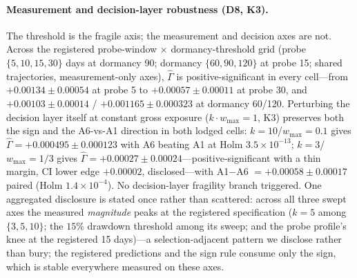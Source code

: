 \documentclass{article}
\begin{document}
\paragraph{Measurement and decision-layer robustness (D8, K3).} The
threshold is the fragile axis; the measurement and decision axes are
not. Across the registered probe-window $\times$ dormancy-threshold
grid (probe $\{5, 10, 15, 30\}$ days at dormancy 90; dormancy
$\{60, 90, 120\}$ at probe 15; shared trajectories, measurement-only
axes), $\hat\Gamma$ is positive-significant in every cell---from
$+0.00134 \pm 0.00054$ at probe 5 to $+0.00057 \pm 0.00011$ at probe
30, and $+0.00103 \pm 0.00014$ / $+0.001165 \pm 0.000323$ at dormancy
60/120. Perturbing the decision layer itself at constant gross
exposure ($k \cdot w_{\max} = 1$, K3) preserves both the sign and
the A6-vs-A1 direction in both lodged cells: $k{=}10$/$w_{\max}{=}0.1$
gives $\hat\Gamma = +0.000495 \pm 0.000123$ with A6 beating A1 at Holm
$3.5\times10^{-13}$; $k{=}3$/$w_{\max}{=}1/3$ gives
$\hat\Gamma = +0.00027 \pm 0.00024$---positive-significant with a
thin margin, CI lower edge $+0.00002$, disclosed---with A1$-$A6
$= +0.00058 \pm 0.00017$ paired (Holm $1.4\times10^{-4}$). No
decision-layer fragility branch triggered. One aggregated disclosure
is stated once rather than scattered: across all three swept axes the
measured \emph{magnitude} peaks at the registered specification
($k{=}5$ among $\{3,5,10\}$; the $15\%$ drawdown threshold among its
sweep; and the probe profile's knee at the registered 15 days)---a
selection-adjacent pattern we disclose rather than bury; the
registered predictions and the sign rule consume only the sign,
which is stable everywhere measured on these axes.
\end{document}
